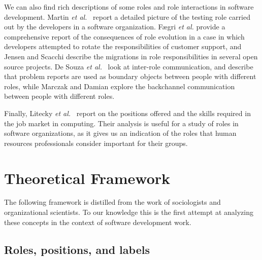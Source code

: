 \documentclass[10pt, conference, compsocconf]{IEEEtran}
\begin{document}
We can also find rich descriptions of some roles and role interactions in software development. Martin \emph{et al.}\ \cite{Martin2007} report a detailed picture of the testing role carried out by the developers in a software organization. F{\ae}gri \emph{et al.} \cite{Faegri2010} provide a comprehensive report of the consequences of role evolution in a case in which developers attempted to rotate the responsibilities of customer support, and Jensen and Scacchi \cite{Jensen2007} describe the migrations in role responsibilities in several open source projects. De Souza \emph{et al.}\ \cite{deSouza2003} look at inter-role communication, and describe that problem reports are used as boundary objects \cite{Bowker1999} between people with different roles, while Marczak and Damian \cite{Marczak2011} explore the backchannel communication between people with different roles.

Finally, Litecky \emph{et al.}\ \cite{Litecky2010} report on the positions offered and the skills required in the job market in computing. Their analysis is useful for a study of roles in software organizations, as it gives us an indication of the roles that human resources professionals consider important for their groups.




\section{Theoretical Framework}

The following framework is distilled from the work of sociologists and organizational scientists. To our knowledge this is the first attempt at analyzing these concepts in the context of software development work.


\subsection{Roles, positions, and labels}
\end{document}
